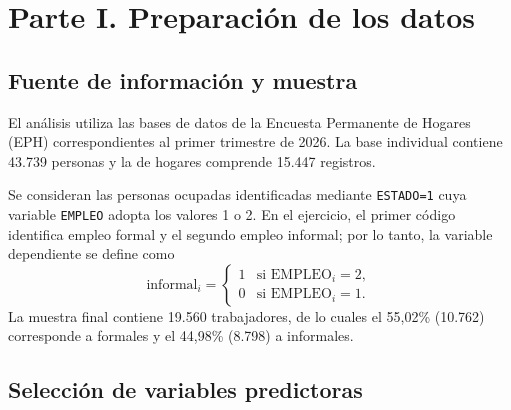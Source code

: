 \section{Parte I. Preparación de los datos}
\label{sec:parte_01}

\subsection{Fuente de información y muestra}

El análisis utiliza las bases de datos de la Encuesta Permanente de Hogares (EPH) correspondientes al primer trimestre de 2026. La base individual contiene 43.739 personas y la de hogares comprende 15.447 registros.

Se consideran las personas ocupadas identificadas mediante \texttt{ESTADO=1} cuya variable \texttt{EMPLEO} adopta los valores 1 o 2. En el ejercicio, el primer código identifica empleo formal y el segundo empleo informal; por lo tanto, la variable dependiente se define como
\begin{equation}
\mathrm{informal}_i =
\left\{\begin{array}{ll}
1 & \mbox{si } \mathrm{EMPLEO}_i=2,\\
0 & \mbox{si } \mathrm{EMPLEO}_i=1.
\end{array}\right.
\label{eq:informal_parte01}
\end{equation}
La muestra final contiene 19.560 trabajadores, de lo cuales el 55,02\% (10.762) corresponde a formales y el 44,98\% (8.798) a informales. 
\subsection{Selección de variables predictoras}

